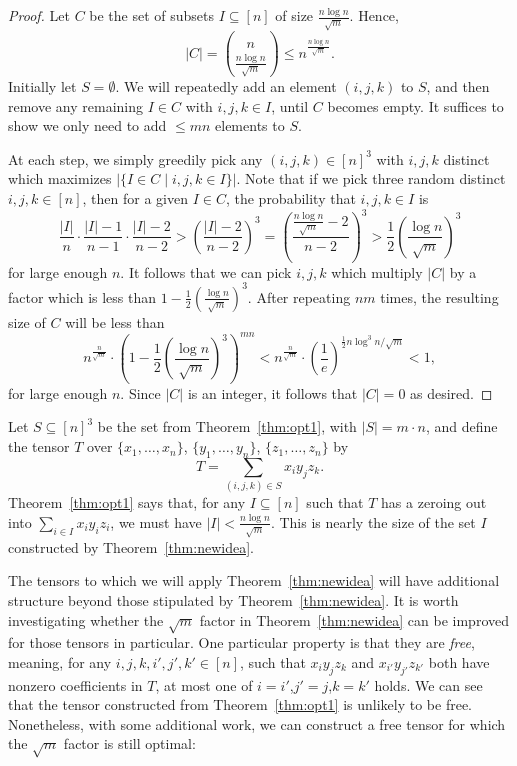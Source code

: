 \PassOptionsToPackage{shortlabels}{enumitem}\documentclass[10pt,a4paper]{article}
\begin{document}
\begin{proof}
Let $C$ be the set of subsets $I \subseteq [n]$ of size $\frac{n \log n}{\sqrt{m}}$. Hence, $$|C| = \binom{n}{\frac{n \log n}{\sqrt{m}}} \leq n^{\frac{n \log n}{\sqrt{m}}}.$$ Initially let $S = \emptyset$. We will repeatedly add an element $(i,j,k)$ to $S$, and then remove any remaining $I \in C$ with $i,j,k \in I$, until $C$ becomes empty. It suffices to show we only need to add $\leq mn$ elements to $S$.
 
At each step, we simply greedily pick any $(i,j,k) \in [n]^3$ with $i,j,k$ distinct which maximizes $|\{ I \in C \mid i,j,k \in I \}|$. Note that if we pick three random distinct $i,j,k \in [n]$, then for a given $I \in C$, the probability that $i,j,k \in I$ is $$\frac{|I|}{n} \cdot \frac{|I|-1}{n-1} \cdot \frac{|I|-2}{n-2} > \left( \frac{|I|-2}{n-2} \right)^3 = \left( \frac{\frac{n \log n}{\sqrt{m}}-2}{n-2} \right)^3 > \frac12 \left( \frac{\log n}{\sqrt{m}} \right)^3$$ for large enough $n$. It follows that we can pick $i,j,k$ which multiply $|C|$ by a factor which is less than $1 - \frac12 \left( \frac{ \log n}{\sqrt{m}} \right)^3$. After repeating $nm$ times, the resulting size of $C$ will be less than 
$$n^{\frac{n}{\sqrt{m}}} \cdot \left( 1 - \frac12 \left( \frac{\log n}{\sqrt{m}} \right)^3 \right)^{mn} < n^{\frac{n}{\sqrt{m}}} \cdot \left( \frac{1}{e} \right)^{\frac12 n \log^3 n / \sqrt{m}} < 1,$$ for large enough $n$. Since $|C|$ is an integer, it follows that $|C|=0$ as desired.
\end{proof}


Let $S \subseteq [n]^3$ be the set from Theorem~\ref{thm:opt1}, with $|S| = m \cdot n$, and define the tensor $T$ over $\{x_1, \ldots, x_n\}$, $\{y_1, \ldots, y_n\}$, $\{z_1, \ldots, z_n\}$ by $$T = \sum_{(i,j,k) \in S} x_i y_j z_k.$$ Theorem~\ref{thm:opt1} says that, for any $I \subseteq [n]$ such that $T$ has a zeroing out into $\sum_{i \in I} x_iy_iz_i$, we must have $|I| < \frac{n \log n}{\sqrt{m}}$. This is nearly the size of the set $I$ constructed by Theorem~\ref{thm:newidea}.

The tensors to which we will apply Theorem~\ref{thm:newidea} will have additional structure beyond those stipulated by Theorem~\ref{thm:newidea}. It is worth investigating whether the $\sqrt{m}$ factor in Theorem~\ref{thm:newidea} can be improved for those tensors in particular. One particular property is that they are \emph{free}, meaning, for any $i,j,k,i',j',k' \in [n]$, such that $x_i y_j z_k$ and $x_{i'}y_{j'}z_{k'}$ both have nonzero coefficients in $T$, at most one of $i=i'$,$j'=j$,$k=k'$ holds. We can see that the tensor constructed from Theorem~\ref{thm:opt1} is unlikely to be free. Nonetheless, with some additional work, we can construct a free tensor for which the $\sqrt{m}$ factor is still optimal:
\end{document}
